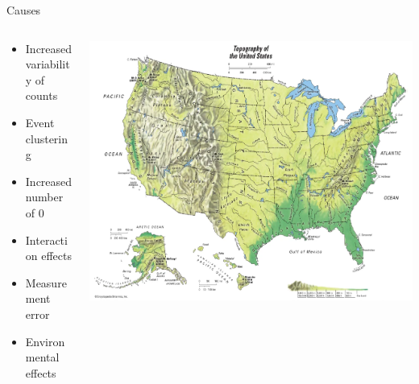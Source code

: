 \documentclass[
  ignorenonframetext,
]{beamer}
\providecommand{\tightlist}{%
  \setlength{\itemsep}{0pt}\setlength{\parskip}{0pt}}\usepackage{longtable,booktabs,array}
\begin{document}
\begin{frame}{Causes}
\label{causes}
\begin{columns}[T]
\begin{column}{0.5\textwidth}
\begin{itemize}
\tightlist
\item
  Increased variability of counts
\item
  Event clustering
\item
  Increased number of 0
\item
  Interaction effects
\item
  Measurement error
\item
  Environmental effects
\end{itemize}
\end{column}

\begin{column}{0.5\textwidth}
\includegraphics{topographic.png}
\end{column}
\end{columns}
\end{frame}
\end{document}
